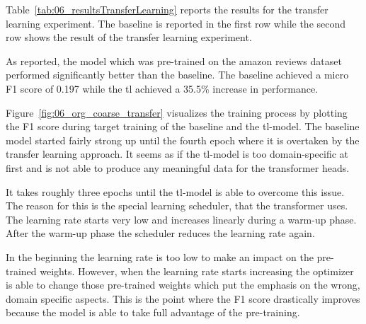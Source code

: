 Table~\ref{tab:06_resultsTransferLearning} reports the results for the transfer learning experiment. The baseline is reported in the first row while the second row shows the result of the transfer learning experiment. 
\medskip

As reported, the model which was pre-trained on the amazon reviews dataset performed significantly better than the baseline. The baseline achieved a micro F1 score of 0.197 while the \gls{tl} achieved a 35.5\% increase in performance. 
\medskip

Figure~\ref{fig:06_org_coarse_transfer} visualizes the training process by plotting the F1 score during target training of the baseline and the \gls{tl}-model. The baseline model started fairly strong up until the fourth epoch where it is overtaken by the transfer learning approach. It seems as if the \gls{tl}-model is too domain-specific at first and is not able to produce any meaningful data for the transformer heads.
\medskip

It takes roughly three epochs until the \gls{tl}-model is able to overcome this issue. The reason for this is the special learning scheduler, that the transformer uses. The learning rate starts very low and increases linearly during a warm-up phase. After the warm-up phase the scheduler reduces the learning rate again.
\medskip

In the beginning the learning rate is too low to make an impact on the pre-trained weights. However, when the learning rate starts increasing the optimizer is able to change those pre-trained weights which put the emphasis on the wrong, domain specific aspects. This is the point where the F1 score drastically improves because the model is able to take full advantage of the pre-training.